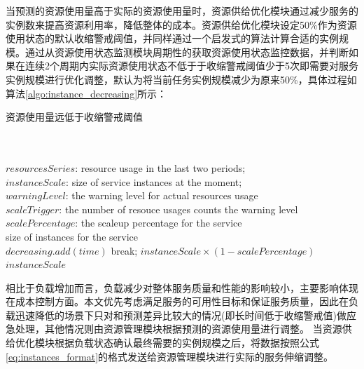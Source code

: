 当预测的资源使用量高于实际的资源使用量时，资源供给优化模块通过减少服务的实例数来提高资源利用率，降低整体的成本。资源供给优化模块设定50\%作为资源使用状态的默认收缩警戒阈值，并同样通过一个启发式的算法计算合适的实例规模。通过从资源使用状态监测模块周期性的获取资源使用状态监控数据，并判断如果在连续2个周期内实际资源使用状态不低于于收缩警戒阈值少于5次即需要对服务实例规模进行优化调整，默认为将当前任务实例规模减少为原来50\%，具体过程如算法\ref{algo:instance_decreasing}所示：
\begin{algorithm}[H]
\caption{资源使用量远低于收缩警戒阈值}
\label{algo:instance_decreasing}
\begin{algorithmic}[0]
\\
\Require ~~\
\\
$resourcesSeries$: resource usage in the last two periods;\\
$instanceScale$: size of service instances at the moment;\\
$warningLevel$: the warning level for actual resources usage \\
$scaleTrigger$: the number of resouce usages counts the warning level \\
$scalePercentage$: the scaleup percentage for the service
\Ensure ~~\
\\
size of instances for the service \\

            \State $decreasing.add(time)$
            \State break;
        \EndIf
    \EndFor
        \State \Return $instanceScale \times (1-scalePercentage)$
    \Else
        \State \Return $instanceScale$
    \EndIf
\EndFor
\end{algorithmic}
\end{algorithm}

相比于负载增加而言，负载减少对整体服务质量和性能的影响较小，主要影响体现在成本控制方面。本文优先考虑满足服务的可用性目标和保证服务质量，因此在负载迅速降低的场景下只对和预测差异比较大的情况(即长时间低于收缩警戒值)做应急处理，其他情况则由资源管理模块根据预测的资源使用量进行调整。
当资源供给优化模块根据负载状态确认最终需要的实例规模之后，将数据按照公式\ref{eq:instances_format}的格式发送给资源管理模块进行实际的服务伸缩调整。


